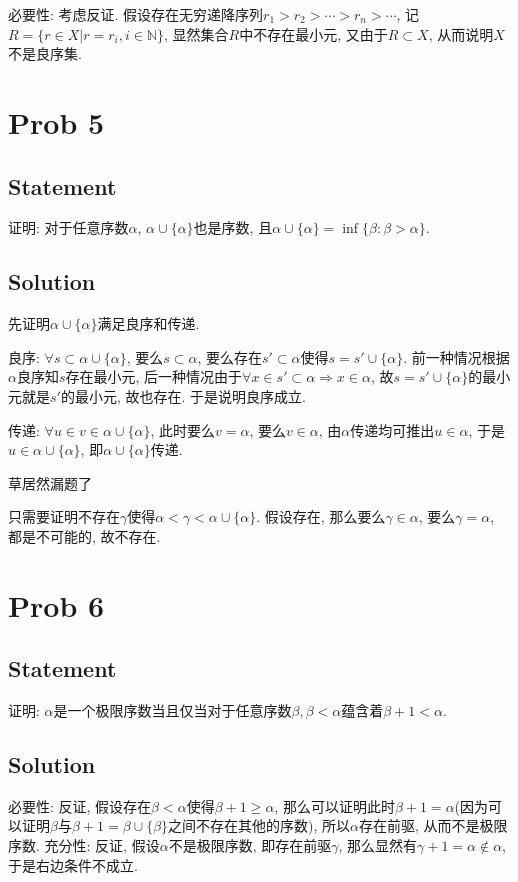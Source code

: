 \documentclass[UTF-8]{ctexart}
\begin{document}
必要性: 考虑反证. 假设存在无穷递降序列$r_1 > r_2 > \cdots > r_n > \cdots$, 记$R = \{r \in X | r = r_i, i \in \mathbb N\}$, 显然集合$R$中不存在最小元, 又由于$R \subset X$, 从而说明$X$不是良序集.

\section{Prob 5}
\subsection{Statement}
证明: 对于任意序数$\alpha$, $\alpha \cup \{\alpha\}$也是序数, 且$\alpha \cup \{\alpha\} = \inf\{\beta : \beta > \alpha\}$.
\subsection{Solution}

先证明$\alpha \cup \{\alpha\}$满足良序和传递.

良序: $\forall s \subset \alpha \cup \{\alpha\}$, 要么$s \subset \alpha$, 要么存在$s' \subset \alpha$使得$s = s' \cup \{\alpha\}$. 前一种情况根据$\alpha$良序知$s$存在最小元, 后一种情况由于$\forall x \in s' \subset \alpha \Rightarrow x \in \alpha$, 故$s = s' \cup \{\alpha\}$的最小元就是$s'$的最小元, 故也存在. 于是说明良序成立.

传递: $\forall u \in v \in \alpha \cup \{\alpha\}$, 此时要么$v = \alpha$, 要么$v \in \alpha$, 由$\alpha$传递均可推出$u \in \alpha$, 于是$u \in \alpha \cup \{\alpha\}$, 即$\alpha \cup \{\alpha\}$传递.

{\color{red}
	草居然漏题了
	
	只需要证明不存在$\gamma$使得$\alpha < \gamma < \alpha \cup \{\alpha\}$. 假设存在, 那么要么$\gamma \in \alpha$, 要么$\gamma = \alpha$, 都是不可能的, 故不存在.
}

{\color{blue}
	\section{Prob 6}
	\subsection{Statement}
	证明: $\alpha$是一个极限序数当且仅当对于任意序数$\beta, \beta < \alpha$蕴含着$\beta + 1 < \alpha$.
	\subsection{Solution}
	必要性: 反证, 假设存在$\beta < \alpha$使得$\beta + 1 \ge \alpha$, 那么可以证明此时$\beta + 1 = \alpha$(因为可以证明$\beta$与$\beta + 1 = \beta \cup \{\beta\}$之间不存在其他的序数), 所以$\alpha$存在前驱, 从而不是极限序数.
	充分性: 反证, 假设$\alpha$不是极限序数, 即存在前驱$\gamma$, 那么显然有$\gamma + 1 = \alpha \notin \alpha$, 于是右边条件不成立.
}
\end{document}
